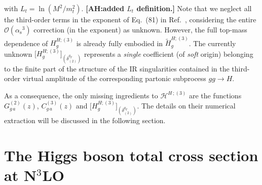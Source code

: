 \documentclass[12pt]{article}
\DeclareRobustCommand{\AH}[1]{\textbf{\quad\color{purple}[AH:\quad #1]}\xspace}
\DeclareRobustCommand{\alphas}{\ensuremath{\alpha_{\mathrm{s}}}\xspace}
\DeclareRobustCommand{\as}{\alphas}
\DeclareRobustCommand{\qt}{\ensuremath{q_T}\xspace}
\DeclareRobustCommand{\cH}{\ensuremath{\mathcal{H}}}
\begin{document}
with $L_t=\ln(M^2/m_t^2)$.
\AH{added $L_t$ definition.}
Note that we neglect all the third-order terms in the exponent of Eq.~(81) in Ref.~\cite{Catani:2013tia}, considering the entire $\mathcal{O}(\as^{3})$ correction (in the exponent) as unknown. However, the full top-mass dependence of $H^{H;(3)}_g$ is already fully embodied in $\widetilde{H}^{H;(3)}_{g}$.
The currently unknown $\big[H^{H;(3)}_{g}\big]_{(\delta^{\qt}_{(2)})}$ represents a \emph{single} coefficient (of \emph{soft} origin) belonging to the finite part of the structure of the IR singularities contained in the third-order virtual amplitude of the corresponding partonic subprocess $gg \to H$. 

As a consequence, the only missing ingredients to $\cH^{H \,;(3)}$ are the functions $G^{(2)}_{g\,a}(z)$, $C^{(3)}_{g\,a}(z)$ and $ \big[H^{H;(3)}_{g}\big]_{(\delta^{\qt}_{(2)})}$. 
The details on their numerical extraction will be discussed in the following section.



\section{The Higgs boson total cross section at \texorpdfstring{N${}^\text{3}$LO}{N3LO}}
\label{sec:numforCN3}
\end{document}

